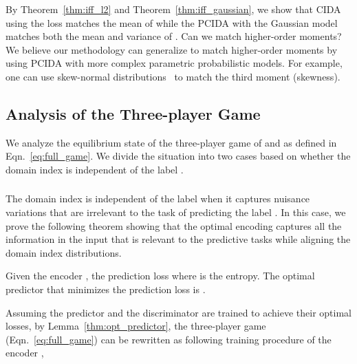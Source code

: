 \documentclass{article}
\newcommand{\lemref}[1]{Lemma~\ref{#1}}
\newcommand{\thmref}[1]{Theorem~\ref{#1}}
\newcommand{\eqnref}[1]{Eqn.~\ref{#1}}
\begin{document}
\begin{remark}
By \thmref{thm:iff_l2} and \thmref{thm:iff_gaussian}, we show that CIDA using the  loss matches the mean of  while the PCIDA with the Gaussian model matches both the mean and variance of . Can we match higher-order moments? We believe our methodology can generalize to match higher-order moments by using PCIDA with more complex parametric probabilistic models. For example, one can use skew-normal distributions~\cite{azzalini2013skew} to match the third moment (skewness). 

\end{remark}



\subsection{Analysis of the Three-player Game}

We analyze the equilibrium state of the three-player game of  and  as defined in \eqnref{eq:full_game}. 
We divide the situation into two cases based on whether the domain index  is independent of the label .

\subsubsection{}
The domain index  is independent of the label  when it captures nuisance variations that are irrelevant to the task of predicting the label . In this case, we prove the following theorem showing that the optimal encoding captures all the information in the input  that is relevant to the predictive tasks while aligning the domain index distributions.

\begin{lemma}
\label{thm:opt_predictor}
Given the encoder , the prediction loss  where  is the entropy. The optimal predictor  that minimizes the prediction loss is .
\end{lemma}

Assuming the predictor  and the discriminator  are trained to achieve their optimal losses, by \lemref{thm:opt_predictor}, the three-player game (\eqnref{eq:full_game}) can be rewritten as following training procedure of the encoder ,
\vspace{-1.5mm}
\end{document}
